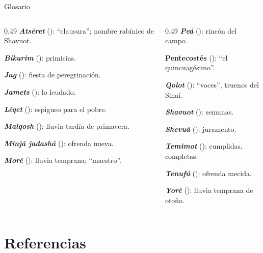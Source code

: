 \begin{frame}{Glosario}
\scriptsize
\begin{columns}[t,onlytextwidth]
\begin{column}{0.49\textwidth}\RaggedRight
\textbf{\emph{Atséret}} (): ``clausura''; nombre rabínico de Shavuot.\par\smallskip
\textbf{\emph{Bikurim}} (): primicias.\par\smallskip
\textbf{\emph{Jag}} (): fiesta de peregrinación.\par\smallskip
\textbf{\emph{Jamets}} (): lo leudado.\par\smallskip
\textbf{\emph{Léqet}} (): espigueo para el pobre.\par\smallskip
\textbf{\emph{Malqosh}} (): lluvia tardía de primavera.\par\smallskip
\textbf{\emph{Minjá jadashá}} (): ofrenda nueva.\par\smallskip
\textbf{\emph{Moré}} (): lluvia temprana; ``maestro''.
\end{column}
\begin{column}{0.49\textwidth}\RaggedRight
\textbf{\emph{Peá}} (): rincón del campo.\par\smallskip
\textbf{Pentecostés} (): ``el quincuagésimo''.\par\smallskip
\textbf{\emph{Qolot}} (): ``voces'', truenos del Sinaí.\par\smallskip
\textbf{\emph{Shavuot}} (): semanas.\par\smallskip
\textbf{\emph{Shevuá}} (): juramento.\par\smallskip
\textbf{\emph{Temimot}} (): cumplidas, completas.\par\smallskip
\textbf{\emph{Tenufá}} (): ofrenda mecida.\par\smallskip
\textbf{\emph{Yoré}} (): lluvia temprana de otoño.
\end{column}
\end{columns}
\end{frame}

\section{Referencias}

